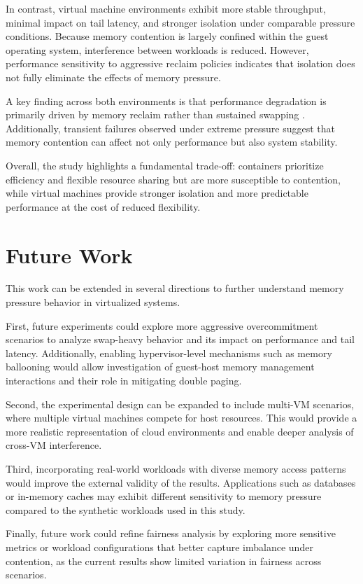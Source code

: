 \documentclass[conference]{IEEEtran}
\begin{document}
In contrast, virtual machine environments exhibit more stable throughput, minimal impact on tail latency, and stronger isolation under comparable pressure conditions. Because memory contention is largely confined within the guest operating system, interference between workloads is reduced. However, performance sensitivity to aggressive reclaim policies indicates that isolation does not fully eliminate the effects of memory pressure.

A key finding across both environments is that performance degradation is primarily driven by memory reclaim rather than sustained swapping \cite{nakazawa2017taming}. Additionally, transient failures observed under extreme pressure suggest that memory contention can affect not only performance but also system stability.

Overall, the study highlights a fundamental trade-off: containers prioritize efficiency and flexible resource sharing but are more susceptible to contention, while virtual machines provide stronger isolation and more predictable performance at the cost of reduced flexibility.

\section{Future Work}

This work can be extended in several directions to further understand memory pressure behavior in virtualized systems.

First, future experiments could explore more aggressive overcommitment scenarios to analyze swap-heavy behavior and its impact on performance and tail latency. Additionally, enabling hypervisor-level mechanisms such as memory ballooning would allow investigation of guest-host memory management interactions and their role in mitigating double paging.

Second, the experimental design can be expanded to include multi-VM scenarios, where multiple virtual machines compete for host resources. This would provide a more realistic representation of cloud environments and enable deeper analysis of cross-VM interference.

Third, incorporating real-world workloads with diverse memory access patterns would improve the external validity of the results. Applications such as databases or in-memory caches may exhibit different sensitivity to memory pressure compared to the synthetic workloads used in this study.

Finally, future work could refine fairness analysis by exploring more sensitive metrics or workload configurations that better capture imbalance under contention, as the current results show limited variation in fairness across scenarios.



\end{document}
